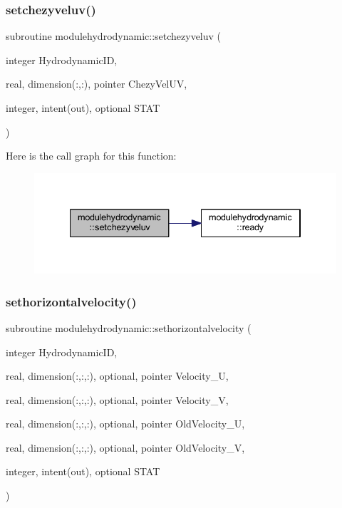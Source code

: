 \subsubsection{\texorpdfstring{setchezyveluv()}{setchezyveluv()}}
{\footnotesize\ttfamily subroutine modulehydrodynamic\+::setchezyveluv (\begin{DoxyParamCaption}\item[{integer}]{Hydrodynamic\+ID,  }\item[{real, dimension(\+:,\+:), pointer}]{Chezy\+Vel\+UV,  }\item[{integer, intent(out), optional}]{S\+T\+AT }\end{DoxyParamCaption})\hspace{0.3cm}{\ttfamily [private]}}

Here is the call graph for this function\+:\nopagebreak
\begin{figure}[H]
\begin{center}
\leavevmode
\includegraphics[width=334pt]{namespacemodulehydrodynamic_a62a3231781314de8d69f6f4216245361_cgraph}
\end{center}
\end{figure}
\mbox{\label{namespacemodulehydrodynamic_a57dc7c696d4679f3a6d7f8f297145b63}} 
\subsubsection{\texorpdfstring{sethorizontalvelocity()}{sethorizontalvelocity()}}
{\footnotesize\ttfamily subroutine modulehydrodynamic\+::sethorizontalvelocity (\begin{DoxyParamCaption}\item[{integer}]{Hydrodynamic\+ID,  }\item[{real, dimension(\+:,\+:,\+:), optional, pointer}]{Velocity\+\_\+U,  }\item[{real, dimension(\+:,\+:,\+:), optional, pointer}]{Velocity\+\_\+V,  }\item[{real, dimension(\+:,\+:,\+:), optional, pointer}]{Old\+Velocity\+\_\+U,  }\item[{real, dimension(\+:,\+:,\+:), optional, pointer}]{Old\+Velocity\+\_\+V,  }\item[{integer, intent(out), optional}]{S\+T\+AT }\end{DoxyParamCaption})\hspace{0.3cm}{\ttfamily [private]}}

